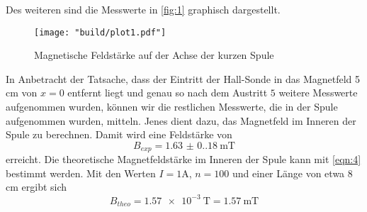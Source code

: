 Des weiteren sind die Messwerte in \autoref{fig:1} graphisch dargestellt.
\begin{figure}[H]
    \caption{Magnetische Feldstärke auf der Achse der kurzen Spule}
    \label{fig:1}
    \centering
    \texttt{[image: "build/plot1.pdf"]}
\end{figure}
\noindent In Anbetracht der Tatsache, dass der Eintritt der Hall-Sonde in das Magnetfeld
5 \unit{\centi\meter} von $x = 0$ entfernt liegt und genau so nach dem Austritt
$5$ weitere Messwerte aufgenommen wurden, können wir die restlichen Messwerte, 
die in der Spule aufgenommen wurden, mitteln. Jenes dient dazu, das Magnetfeld 
im Inneren der Spule zu berechnen. Damit wird eine Feldstärke von 
\begin{equation*}
    B_{exp} = \qty{1.63(0.18)}{\milli\tesla}
\end{equation*}
erreicht. Die theoretische Magnetfeldstärke im Inneren der Spule kann mit
\autoref{eqn:4} bestimmt werden. Mit den Werten $I = 1 \unit{\ampere}$,
$n = 100$ und einer Länge von etwa 8 \unit{\centi\meter}
ergibt sich 
\begin{equation*}
    B_{theo} = \qty{1.57e-3}{\tesla} = \qty{1.57}{\milli\tesla}
\end{equation*}

